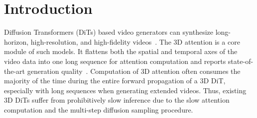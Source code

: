 
\section{Introduction}
\label{sec:intro}
Diffusion Transformers (DiTs) based video generators can synthesize long-horizon, high-resolution, and high-fidelity videos~\citep{peebles2023scalable, openai_sora, kuaishou_kling, pku_yuan_lab_and_tuzhan_ai_etc_2024_10948109, opensora, esser2023structure, yang2024cogvideox}. 
The 3D attention is a core module of such models. It flattens both the spatial and temporal axes of the video data into one long sequence for attention computation and reports state-of-the-art generation quality~\citep{pku_yuan_lab_and_tuzhan_ai_etc_2024_10948109, yang2024cogvideox, huang2024vbench}. 
Computation of 3D attention often consumes the majority of the time during the entire forward propagation of a 3D DiT, especially with long sequences when generating extended videos. 
Thus, existing 3D DiTs suffer from prohibitively slow inference due to the slow attention computation and the multi-step diffusion sampling procedure. 





